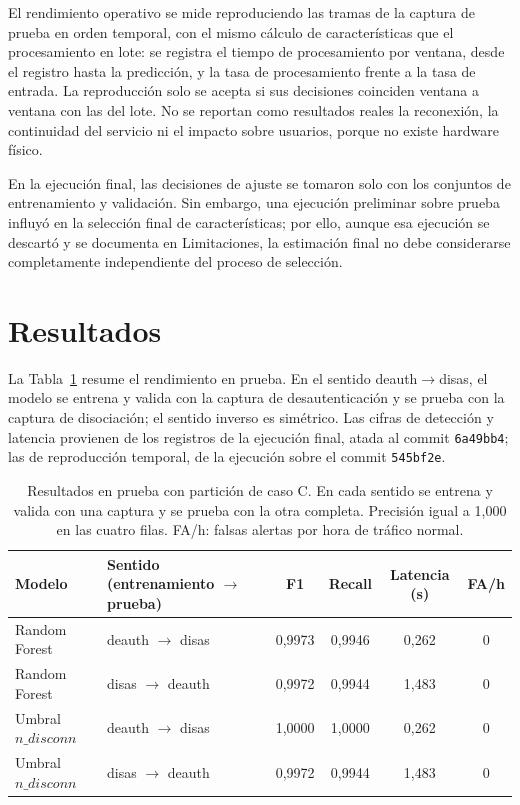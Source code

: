 \documentclass[journal]{IEEEtran}
\begin{document}
El rendimiento operativo se mide reproduciendo las tramas de la captura de prueba en orden temporal, con el mismo cálculo de características que el procesamiento en lote: se registra el tiempo de procesamiento por ventana, desde el registro hasta la predicción, y la tasa de procesamiento frente a la tasa de entrada. La reproducción solo se acepta si sus decisiones coinciden ventana a ventana con las del lote. No se reportan como resultados reales la reconexión, la continuidad del servicio ni el impacto sobre usuarios, porque no existe hardware físico.

En la ejecución final, las decisiones de ajuste se tomaron solo con los conjuntos de entrenamiento y validación. Sin embargo, una ejecución preliminar sobre prueba influyó en la selección final de características; por ello, aunque esa ejecución se descartó y se documenta en Limitaciones, la estimación final no debe considerarse completamente independiente del proceso de selección.

\section{Resultados}

La Tabla~\ref{tab:resultados} resume el rendimiento en prueba. En el sentido deauth$\rightarrow$disas, el modelo se entrena y valida con la captura de desautenticación y se prueba con la captura de disociación; el sentido inverso es simétrico. Las cifras de detección y latencia provienen de los registros de la ejecución final, atada al commit \texttt{6a49bb4}; las de reproducción temporal, de la ejecución sobre el commit \texttt{545bf2e}.

\begin{table}[htbp]
\caption{Resultados en prueba con partición de caso C. En cada sentido se entrena y valida con una captura y se prueba con la otra completa. Precisión igual a 1,000 en las cuatro filas. FA/h: falsas alertas por hora de tráfico normal.}
\label{tab:resultados}
\centering
\begin{tabular}{llcccc}
\hline
Modelo & Sentido (entrenamiento $\rightarrow$ prueba) & F1 & Recall & Latencia (s) & FA/h \\
\hline
Random Forest & deauth $\rightarrow$ disas & 0,9973 & 0,9946 & 0,262 & 0 \\
Random Forest & disas $\rightarrow$ deauth & 0,9972 & 0,9944 & 1,483 & 0 \\
Umbral $n\_disconn$ & deauth $\rightarrow$ disas & 1,0000 & 1,0000 & 0,262 & 0 \\
Umbral $n\_disconn$ & disas $\rightarrow$ deauth & 0,9972 & 0,9944 & 1,483 & 0 \\
\hline
\end{tabular}
\end{table}
\end{document}

